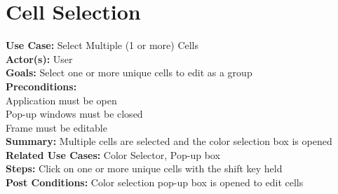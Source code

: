 \documentclass[12pt,a4paper]{article}
\begin{document}

\section*{Cell Selection}
\textbf{Use Case:} Select Multiple (1 or more) Cells \\
\textbf{Actor(s):} User \\ 
\textbf{Goals:} Select one or more unique cells to edit as a group \\
\textbf{Preconditions:} \\
Application must be open \\
Pop-up windows must be closed \\
Frame must be editable \\
\textbf{Summary:} Multiple cells are selected and the color selection box is opened \\
\textbf{Related Use Cases:} Color Selector, Pop-up box \\
\textbf{Steps:} Click on one or more unique cells with the shift key held \\
\textbf{Post Conditions:} Color selection pop-up box is opened to edit cells \\
\end{document}
